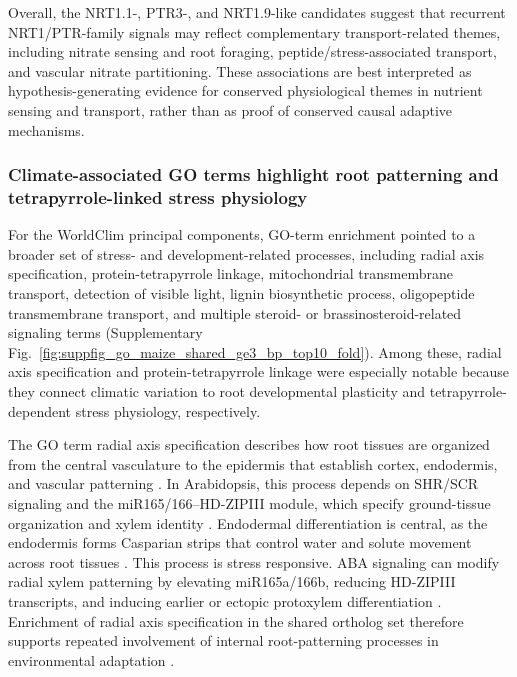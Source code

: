 \documentclass[unnumsec,webpdf,contemporary,large]{oup-authoring-template}%
\theoremstyle{thmstyleone}%
\theoremstyle{thmstyletwo}%
\theoremstyle{thmstylethree}%
\begin{document}
Overall, the NRT1.1-, PTR3-, and NRT1.9-like candidates suggest that recurrent NRT1/PTR-family signals may reflect complementary transport-related themes, including nitrate sensing and root foraging, peptide/stress-associated transport, and vascular nitrate partitioning. These associations are best interpreted as hypothesis-generating evidence for conserved physiological themes in nutrient sensing and transport, rather than as proof of conserved causal adaptive mechanisms.



\subsubsection{Climate-associated GO terms highlight root patterning and tetrapyrrole-linked stress physiology}

For the WorldClim principal components, GO-term enrichment pointed to a broader set of stress- and development-related processes, including radial axis specification, protein-tetrapyrrole linkage, mitochondrial transmembrane transport, detection of visible light, lignin biosynthetic process, oligopeptide transmembrane transport, and multiple steroid- or brassinosteroid-related signaling terms (Supplementary Fig.~\ref{fig:suppfig_go_maize_shared_ge3_bp_top10_fold}). Among these, radial axis specification and protein-tetrapyrrole linkage were especially notable because they connect climatic variation to root developmental plasticity and tetrapyrrole-dependent stress physiology, respectively.

The GO term radial axis specification describes how root tissues are organized from the central vasculature to the epidermis that establish cortex, endodermis, and vascular patterning \citep{DiMambro2019}. In Arabidopsis, this process depends on SHR/SCR signaling and the miR165/166--HD-ZIPIII module, which specify ground-tissue organization and xylem identity \citep{DiMambro2019,Bloch2019}. Endodermal differentiation is central, as the endodermis forms Casparian strips that control water and solute movement across root tissues \citep{DiMambro2019}. This process is stress responsive. ABA signaling can modify radial xylem patterning by elevating miR165a/166b, reducing HD-ZIPIII transcripts, and inducing earlier or ectopic protoxylem differentiation \citep{Bloch2019}. Enrichment of radial axis specification in the shared ortholog set therefore supports repeated involvement of internal root-patterning processes in environmental adaptation \citep{Julkowska2017,Kaur2026}.
\end{document}
